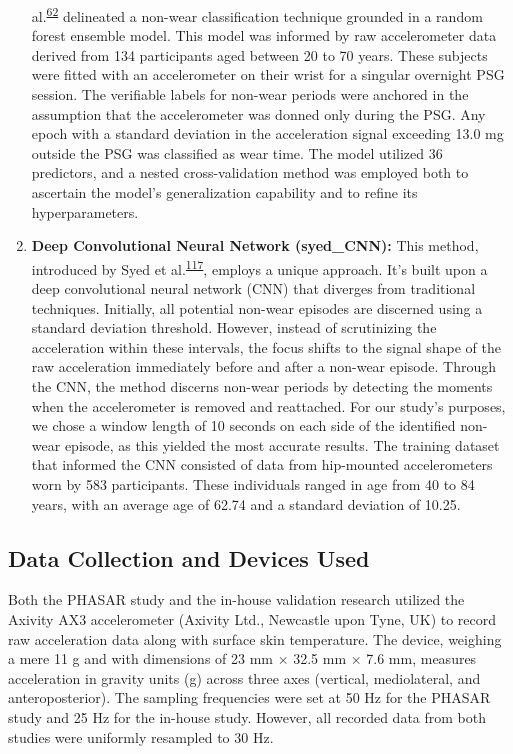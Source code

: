 \documentclass[
  9pt,
]{scrbook}
\begin{document}
\begin{enumerate}
  al.\textsuperscript{\protect\hyperlink{ref-sundararajan_sleep_2021}{62}}
  delineated a non-wear classification technique grounded in a random
  forest ensemble model. This model was informed by raw accelerometer
  data derived from 134 participants aged between 20 to 70 years. These
  subjects were fitted with an accelerometer on their wrist for a
  singular overnight PSG session. The verifiable labels for non-wear
  periods were anchored in the assumption that the accelerometer was
  donned only during the PSG. Any epoch with a standard deviation in the
  acceleration signal exceeding 13.0 mg outside the PSG was classified
  as wear time. The model utilized 36 predictors, and a nested
  cross-validation method was employed both to ascertain the model's
  generalization capability and to refine its hyperparameters.
\item
  \textsf{\textbf{Deep Convolutional Neural Network (syed\_CNN):}} This
  method, introduced by Syed et
  al.\textsuperscript{\protect\hyperlink{ref-syed_novel_2021}{117}},
  employs a unique approach. It's built upon a deep convolutional neural
  network (CNN) that diverges from traditional techniques. Initially,
  all potential non-wear episodes are discerned using a standard
  deviation threshold. However, instead of scrutinizing the acceleration
  within these intervals, the focus shifts to the signal shape of the
  raw acceleration immediately before and after a non-wear episode.
  Through the CNN, the method discerns non-wear periods by detecting the
  moments when the accelerometer is removed and reattached. For our
  study's purposes, we chose a window length of 10 seconds on each side
  of the identified non-wear episode, as this yielded the most accurate
  results. The training dataset that informed the CNN consisted of data
  from hip-mounted accelerometers worn by 583 participants. These
  individuals ranged in age from 40 to 84 years, with an average age of
  62.74 and a standard deviation of 10.25.
\end{enumerate}

\hypertarget{data-collection-and-devices-used}{%
\subsection{Data Collection and Devices
Used}\label{data-collection-and-devices-used}}

Both the PHASAR study and the in-house validation research utilized the
Axivity AX3 accelerometer (Axivity Ltd., Newcastle upon Tyne, UK) to
record raw acceleration data along with surface skin temperature. The
device, weighing a mere 11 g and with dimensions of 23 mm × 32.5 mm ×
7.6 mm, measures acceleration in gravity units (g) across three axes
(vertical, mediolateral, and anteroposterior). The sampling frequencies
were set at 50 Hz for the PHASAR study and 25 Hz for the in-house study.
However, all recorded data from both studies were uniformly resampled to
30 Hz.
\end{document}
